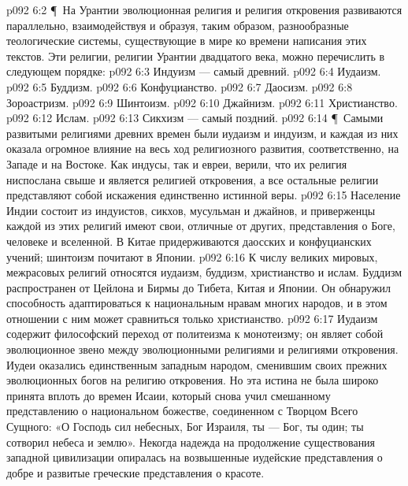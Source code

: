 \vs p092 6:2 \P\ На Урантии эволюционная религия и религия откровения развиваются параллельно, взаимодействуя и образуя, таким образом, разнообразные теологические системы, существующие в мире ко времени написания этих текстов. Эти религии, религии Урантии двадцатого века, можно перечислить в следующем порядке:
\vs p092 6:3 \bibnobreakspace Индуизм --- самый древний.
\vs p092 6:4 \bibnobreakspace Иудаизм.
\vs p092 6:5 \bibnobreakspace Буддизм.
\vs p092 6:6 \bibnobreakspace Конфуцианство.
\vs p092 6:7 \bibnobreakspace Даосизм.
\vs p092 6:8 \bibnobreakspace Зороастризм.
\vs p092 6:9 \bibnobreakspace Шинтоизм.
\vs p092 6:10 \bibnobreakspace Джайнизм.
\vs p092 6:11 \bibnobreakspace Христианство.
\vs p092 6:12 \bibnobreakspace Ислам.
\vs p092 6:13 \bibnobreakspace Сикхизм --- самый поздний.
\vs p092 6:14 \P\ Самыми развитыми религиями древних времен были иудаизм и индуизм, и каждая из них оказала огромное влияние на весь ход религиозного развития, соответственно, на Западе и на Востоке. Как индусы, так и евреи, верили, что их религия ниспослана свыше и является религией откровения, а все остальные религии представляют собой искажения единственно истинной веры.
\vs p092 6:15 Население Индии состоит из индуистов, сикхов, мусульман и джайнов, и приверженцы каждой из этих религий имеют свои, отличные от других, представления о Боге, человеке и вселенной. В Китае придерживаются даосских и конфуцианских учений; шинтоизм почитают в Японии.
\vs p092 6:16 К числу великих мировых, межрасовых религий относятся иудаизм, буддизм, христианство и ислам. Буддизм распространен от Цейлона и Бирмы до Тибета, Китая и Японии. Он обнаружил способность адаптироваться к национальным нравам многих народов, и в этом отношении с ним может сравниться только христианство.
\vs p092 6:17 Иудаизм содержит философский переход от политеизма к монотеизму; он являет собой эволюционное звено между эволюционными религиями и религиями откровения. Иудеи оказались единственным западным народом, сменившим своих прежних эволюционных богов на религию откровения. Но эта истина не была широко принята вплоть до времен Исаии, который снова учил смешанному представлению о национальном божестве, соединенном с Творцом Всего Сущного: «О Господь сил небесных, Бог Израиля, ты --- Бог, ты один; ты сотворил небеса и землю». Некогда надежда на продолжение существования западной цивилизации опиралась на возвышенные иудейские представления о добре и развитые греческие представления о красоте.
